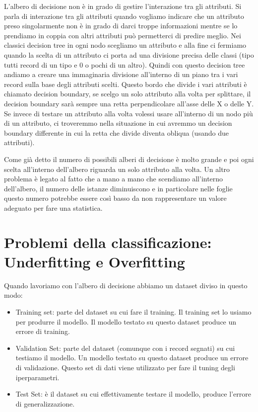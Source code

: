 \documentclass[14pt]{extreport}
\begin{document}
L'albero di decisione non è in grado di gestire l'interazione tra gli attributi. Si parla di interazione tra gli attributi quando vogliamo indicare che un attributo preso singolarmente non è in grado di darci troppe informazioni mentre se lo prendiamo in coppia con altri attributi può permetterci di predire meglio.
    Nei classici decision tree in ogni nodo scegliamo un attributo e alla fine ci fermiamo quando la scelta di un attributo ci porta ad una divisione precisa delle classi (tipo tutti record di un tipo e 0 o pochi di un altro).
    Quindi con questo decision tree andiamo a creare una immaginaria divisione all'interno di un piano tra i vari record sulla base degli attributi scelti.
    Questo bordo che divide i vari attributi è chiamato decision boundary, se scelgo un solo attributo alla volta per splittare, il decision boundary sarà sempre una retta perpendicolare all'asse delle X o delle Y.
    Se invece di testare un attributo alla volta volessi usare all'interno di un nodo più di un attributo, ci troveremmo nella situazione in cui avremmo un decision boundary differente in cui la retta che divide diventa obliqua (usando due attributi).

Come già detto il numero di possibili alberi di decisione è molto grande e poi ogni scelta all'interno dell'albero riguarda un solo attributo alla volta.
Un altro problema è legato al fatto che a mano a mano che scendiamo all'interno dell'albero, il numero delle istanze diminuiscono e in particolare nelle foglie questo numero potrebbe essere così basso da non rappresentare un valore adeguato per fare una statistica.

\section{Problemi della classificazione: Underfitting e Overfitting}

Quando lavoriamo con l'albero di decisione abbiamo un dataset diviso in questo modo:
\begin{itemize}
    \item Training set: parte del dataset su cui fare il training. Il training set lo usiamo per produrre il modello. Il modello testato su questo dataset produce un errore di training.
    \item Validation Set: parte del dataset (comunque con i record segnati) su cui testiamo il modello. Un modello testato su questo dataset produce un errore di validazione. Questo set di dati viene utilizzato per fare il tuning degli iperparametri.
    \item Test Set: è il dataset su cui effettivamente testare il modello, produce l'errore di generalizzazione.
\end{itemize}
\end{document}
